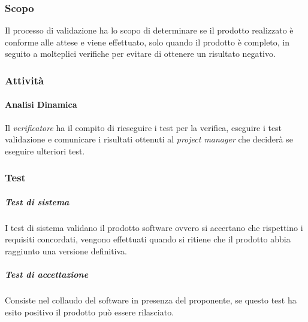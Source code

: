 \subsubsection{Scopo}
Il processo di validazione ha lo scopo di determinare se il prodotto realizzato è conforme alle attese e viene effettuato, solo quando il prodotto è completo, in seguito a molteplici verifiche per evitare di ottenere un risultato negativo.
\subsubsection{Attività}
\paragraph{Analisi Dinamica} \Spazio
Il \textit{verificatore} ha il compito di rieseguire i test per la verifica, eseguire i test validazione e comunicare i risultati ottenuti al \textit{project manager} che deciderà se eseguire ulteriori test.
\subsubsection{Test}
\subparagraph{Test di sistema} \Spazio
I test di sistema validano il prodotto software ovvero si accertano che rispettino i requisiti concordati, vengono effettuati quando si ritiene che il prodotto abbia raggiunto una versione definitiva.
\subparagraph{Test di accettazione} \Spazio
Consiste nel collaudo del software in presenza del proponente, se questo test ha esito positivo il prodotto può essere rilasciato.
